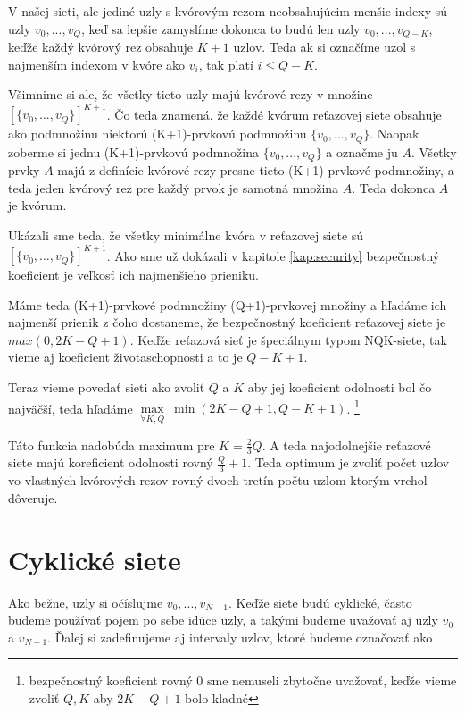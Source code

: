 V našej sieti, ale jediné uzly s kvórovým rezom neobsahujúcim menšie indexy
sú uzly $v_0, ..., v_{Q}$, keď sa lepšie zamyslíme dokonca to budú len uzly
$v_0, ..., v_{Q-K}$, keďže každý kvórový rez obsahuje $K+1$ uzlov.
Teda ak si označíme uzol s najmenším indexom v kvóre ako $v_i$, tak platí
$i\leq Q-K$.

Všimnime si ale, že všetky tieto uzly majú kvórové rezy v množine $[\{v_0, ..., v_Q\}]^{K+1}$.
Čo teda znamená, že každé kvórum reťazovej siete obsahuje ako podmnožinu
niektorú (K+1)-prvkovú podmnožinu $\{v_0, ..., v_Q\}$.
Naopak zoberme si jednu (K+1)-prvkovú podmnožina $\{v_0, ..., v_Q\}$ a označme ju $A$.
Všetky prvky $A$ majú z definície kvórové rezy presne tieto (K+1)-prvkové podmnožiny,
a teda jeden kvórový rez pre každý prvok je samotná množina $A$. Teda dokonca $A$
je kvórum.

Ukázali sme teda, že všetky minimálne kvóra v reťazovej siete sú $[\{v_0, ..., v_Q\}]^{K+1}$.
Ako sme už dokázali v kapitole \ref{kap:security} bezpečnostný koeficient je
veľkosť ich najmenšieho prieniku.

Máme teda (K+1)-prvkové podmnožiny (Q+1)-prvkovej množiny a hľadáme ich
najmenší prienik z čoho dostaneme, že bezpečnostný koeficient
reťazovej siete je\\ $max (0,2K-Q+1)$.
Keďže reťazová sieť je špeciálnym typom NQK-siete, tak vieme aj
koeficient životaschopnosti a to je $Q-K+1$.

Teraz vieme povedať sieti ako zvoliť $Q$ a $K$ aby jej koeficient odolnosti bol
čo najväčší, teda hľadáme $\max\limits_{\forall K,Q} \: \min (2K-Q+1, Q-K+1)$.
\footnote{bezpečnostný koeficient rovný 0 sme nemuseli zbytočne uvažovať,
keďže vieme zvoliť $Q,K$ aby $2K-Q+1$ bolo kladné}

Táto funkcia nadobúda maximum pre $K = \frac{2}{3}Q$. A teda najodolnejšie
reťazové siete majú koreficient odolnosti rovný $\frac{Q}{3}+1$.
Teda optimum je zvoliť počet uzlov vo vlastných kvórových rezov rovný dvoch
tretín počtu uzlom ktorým vrchol dôveruje.

\section {Cyklické siete}

Ako bežne, uzly si očíslujme $v_0, ..., v_{N-1}$.
Keďže siete budú cyklické, často budeme používať pojem po sebe idúce uzly,
a takými budeme uvažovať aj uzly $v_0$ a $v_{N-1}$.
Ďalej si zadefinujeme aj intervaly uzlov, ktoré budeme označovať ako


